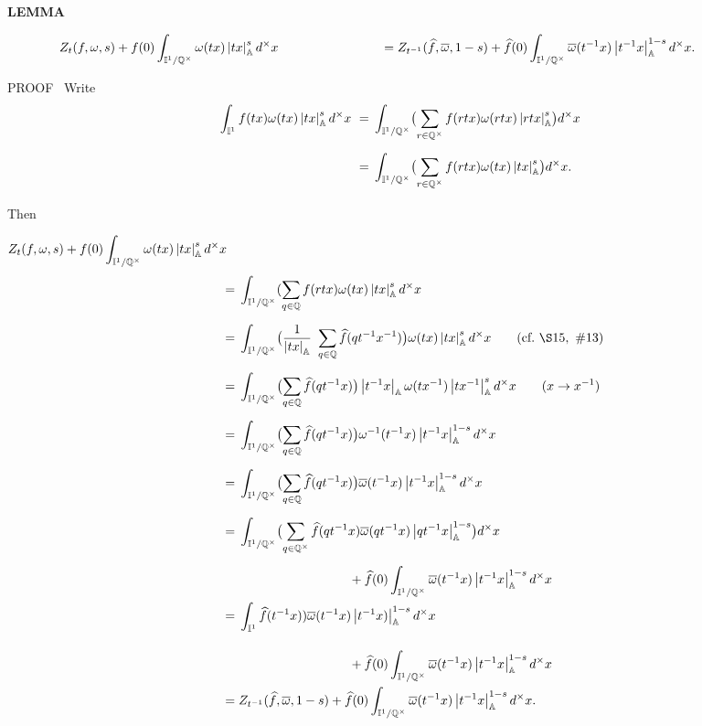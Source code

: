\begin{x}{\small\bf LEMMA} \ %
\ \qquad\\
\vspace{0.1cm}

$
\text{\qquad\qquad} Z_t(f,\omega,s) + f(0) \displaystyle\int_{\mathbb{I}^1/\mathbb{Q}^\times} \omega(tx)\left\vert tx\right\vert_{\mathbb{A}}^s  d^\times x\\
\text{\qquad\qquad\qquad\qquad} = Z_{t^{-1}}(\widehat{f},\overline{\omega},1-s) + 
\widehat{f}(0) \int_{\mathbb{I}^1/\mathbb{Q}^\times} \overline{\omega}(t^{-1}x)\left\vert t^{-1}x\right\vert_{\mathbb{A}}^{1-s}  d^\times x.\\
$

\vspace{0.1cm}

PROOF \ 
Write
\begin{align*}
\int_{\I^1} f(tx)\omega(tx)\abs{tx}_\A^s  d^\times x \ 
&=\vsx \int_{\I^1/\Q^\times} \bigl(\sum_{r \in \Q^\times} f(rtx) \omega(rtx) \abs{rtx}_\A^s \bigr) d^\times x\\	
&=\vsx \int_{\I^1/\Q^\times} \bigl(\sum_{r \in \Q^\times} f(rtx) \omega(tx) \abs{tx}_\A^s \bigr) d^\times x.	
\end{align*}
Then

\allowdisplaybreaks
$
Z_t(f,\omega,s) + f(0) \displaystyle\int_{\mathbb{I}^1/\mathbb{Q}^\times} \omega(tx)\left\vert tx\right\vert_{\mathbb{A}}^s  d^\times x
$
\begin{align*}
\quad \quad     
&=\vsx  \int_{\I^1/\Q^\times} (\sum_{q \in \Q} f(rtx) \omega(tx) \abs{tx}_\A^s d^\times x\\	
&=\vsx \int_{\I^1/\Q^\times} \bigl(\frac{1}{\abs{tx}_\A} \ \sum_{q \in \Q} \widehat{f}(qt^{-1}x^{-1})\bigr) \omega(tx) \abs{tx}_\A^s d^\times x \qquad (\text{cf.} \  \S15, \ \#13)\\
&=\vsx \int_{\I^1/\Q^\times} \bigl(\sum_{q \in \Q} \widehat{f}(qt^{-1}x)\bigr) \abs{t^{-1}x}_\A\omega(tx^{-1}) \abs{tx^{-1}}_\A^s d^\times x \qquad \text{$(x \ra x^{-1})$}\\
&=\vsx \int_{\I^1/\Q^\times} \bigl(\sum_{q \in \Q} \widehat{f}(qt^{-1}x)\bigr) \omega^{-1}(t^{-1}x) \abs{t^{-1}x}_\A^{1-s} d^\times x \\
&=\vsx \int_{\I^1/\Q^\times} \bigl(\sum_{q \in \Q} \widehat{f}(qt^{-1}x)\bigr) \ov{\omega}(t^{-1}x) \abs{t^{-1}x}_\A^{1-s} d^\times x \\
&=\vsx \int_{\I^1/\Q^\times} \bigl(\sum_{q \in \Q^\times} \widehat{f}(qt^{-1}x) \ov{\omega}(qt^{-1}x) \abs{qt^{-1}x}_\A^{1-s} \bigr)d^\times x \\
&\hspace{3.5cm} + \widehat{f}(0) \int_{\I^1/\Q^\times} \ov{\omega}(t^{-1}x)\abs{t^{-1}x}_\A^{1-s}  d^\times x \\
&=\vsx \int_{\I^1} \widehat{f}(t^{-1}x)) \ov{\omega}(t^{-1}x) \abs{t^{-1}x)}_\A^{1-s} d^\times x \\
&\hspace{3.5cm} + \widehat{f}(0) \int_{\I^1/\Q^\times} \ov{\omega}(t^{-1}x)\abs{t^{-1}x}_\A^{1-s}  d^\times x\\
&=\vsx Z_{t^{-1}}(\widehat{f},\ov{\omega},1-s) + \widehat{f}(0) \int_{\I^1/\Q^\times} \ov{\omega}(t^{-1}x)\abs{t^{-1}x}_\A^{1-s}  d^\times x.
\end{align*}



\end{x}
